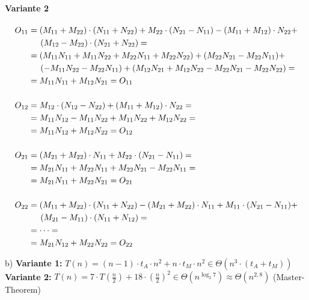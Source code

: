 \paragraph*{Variante 2}
	\begin{align*}
    	O_{11} &= (M_{11} + M_{22}) \cdot (N_{11} + N_{22}) + M_{22} \cdot (N_{21} - N_{11}) - (M_{11} + M_{12}) \cdot N_{22} + \\ 
        &\hphantom{=~~} (M_{12} - M_{22}) \cdot (N_{21} + N_{22}) = \\
        &= (M_{11}N_{11} + M_{11}N_{22} + M_{22}N_{11} + M_{22}N_{22}) + (M_{22}N_{21} - M_{22}N_{11}) + \\
        &\hphantom{=~~} (-M_{11}N_{22} - M_{22}N_{11}) + (M_{12}N_{21} + M_{12}N_{22} - M_{22}N_{21} - M_{22}N_{22}) = \\
        &= M_{11}N_{11} + M_{12}N_{21} = O_{11}\\[0.5cm]
        O_{12} &= M_{12} \cdot (N_{12} - N_{22}) + (M_{11} + M_{12}) \cdot N_{22} = \\
        &= M_{11}N_{12} - M_{11}N_{22} + M_{11}N_{22} + M_{12}N_{22} = \\
        &= M_{11}N_{12} + M_{12}N_{22} = O_{12} \\[0.5cm]
        O_{21} &= (M_{21} + M_{22}) \cdot N_{11} + M_{22} \cdot (N_{21} - N_{11}) = \\
        &= M_{21}N_{11} + M_{22}N_{11} + M_{22}N_{21} - M_{22}N_{11} = \\
        &= M_{21}N_{11} + M_{22}N_{21} = O_{21} \\[0.5cm]
        O_{22} &= (M_{11} + M_{22}) \cdot (N_{11} + N_{22}) - (M_{21} + M_{22}) \cdot N_{11} + M_{11} \cdot (N_{21} - N_{11}) + \\
        &\hphantom{=~~} (M_{21} - M_{11}) \cdot (N_{11} + N_{12}) = \\
        &= \dots = \\
        &= M_{21}N_{12} + M_{22}N_{22} = O_{22}
    \end{align*}
    
    \nuffsaid
    
b) \textbf{Variante 1:} $T(n) = (n - 1) \cdot t_A \cdot n^2 + n \cdot t_M \cdot n^2 \in \Theta(n^3 \cdot (t_A + t_M))$ \\
\textbf{Variante 2:} $T(n) = 7 \cdot T\left( \frac{n}{2} \right) + 18 \cdot \left( \frac{n}{2} \right)^2 \in \Theta( n^{\log_{2}{7}} ) \approx \Theta( n^{2,8} )$ (Master-Theorem)
